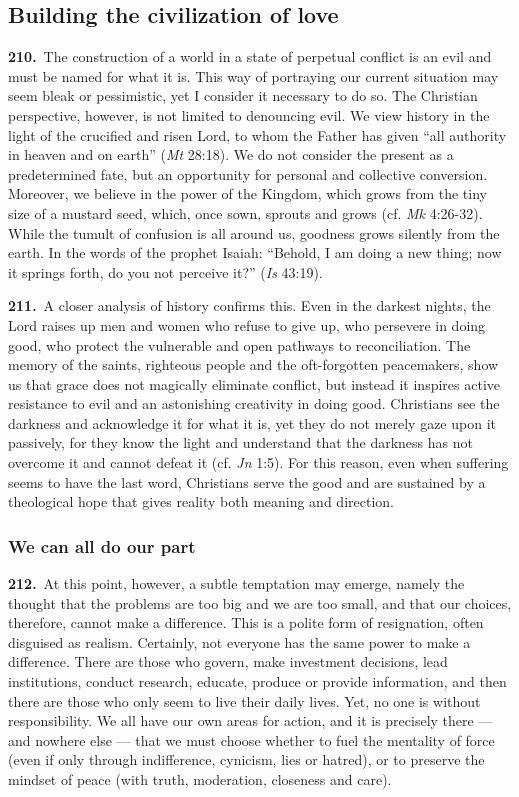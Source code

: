 \documentclass{article}
\begin{document}
\subsection{Building the civilization of love}

\textbf{210.}\ The construction of a world in a state of perpetual conflict is an evil and must be named for what it is. This way of portraying our current situation may seem bleak or pessimistic, yet I consider it necessary to do so. The Christian perspective, however, is not limited to denouncing evil. We view history in the light of the crucified and risen Lord, to whom the Father has given ``all authority in heaven and on earth'' (\emph{Mt} 28:18). We do not consider the present as a predetermined fate, but an opportunity for personal and collective conversion. Moreover, we believe in the power of the Kingdom, which grows from the tiny size of a mustard seed, which, once sown, sprouts and grows (cf. \emph{Mk} 4:26-32). While the tumult of confusion is all around us, goodness grows silently from the earth. In the words of the prophet Isaiah: ``Behold, I am doing a new thing; now it springs forth, do you not perceive it?'' (\emph{Is} 43:19).

\textbf{211.}\ A closer analysis of history confirms this. Even in the darkest nights, the Lord raises up men and women who refuse to give up, who persevere in doing good, who protect the vulnerable and open pathways to reconciliation. The memory of the saints, righteous people and the oft-forgotten peacemakers, show us that grace does not magically eliminate conflict, but instead it inspires active resistance to evil and an astonishing creativity in doing good. Christians see the darkness and acknowledge it for what it is, yet they do not merely gaze upon it passively, for they know the light and understand that the darkness has not overcome it and cannot defeat it (cf. \emph{Jn} 1:5). For this reason, even when suffering seems to have the last word, Christians serve the good and are sustained by a theological hope that gives reality both meaning and direction.

\subsubsection{We can all do our part}

\textbf{212.}\ At this point, however, a subtle temptation may emerge, namely the thought that the problems are too big and we are too small, and that our choices, therefore, cannot make a difference. This is a polite form of resignation, often disguised as realism. Certainly, not everyone has the same power to make a difference. There are those who govern, make investment decisions, lead institutions, conduct research, educate, produce or provide information, and then there are those who only seem to live their daily lives. Yet, no one is without responsibility. We all have our own areas for action, and it is precisely there --- and nowhere else --- that we must choose whether to fuel the mentality of force (even if only through indifference, cynicism, lies or hatred), or to preserve the mindset of peace (with truth, moderation, closeness and care).
\end{document}
